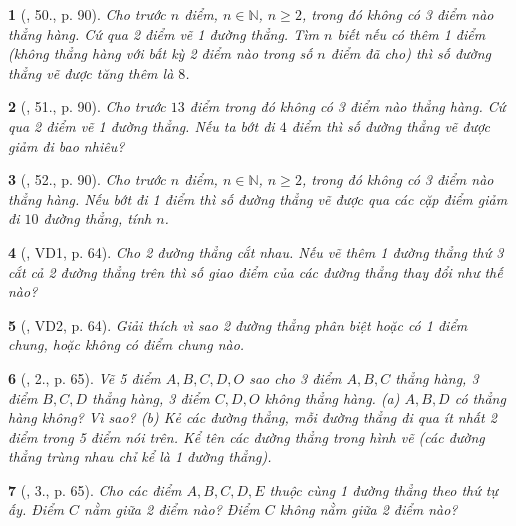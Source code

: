 \documentclass{article}
\newtheorem{baitoan}{}
\begin{document}
\begin{baitoan}[\cite{Tuyen_Toan_6}, 50., p. 90]
	Cho trước $n$ điểm, $n\in\mathbb{N}$, $n\ge2$, trong đó không có 3 điểm nào thẳng hàng. Cứ qua 2 điểm vẽ 1 đường thẳng. Tìm $n$ biết nếu có thêm 1 điểm (không thẳng hàng với bất kỳ 2 điểm nào trong số $n$ điểm đã cho) thì số đường thẳng vẽ được tăng thêm là $8$.
\end{baitoan}

\begin{baitoan}[\cite{Tuyen_Toan_6}, 51., p. 90]
	Cho trước $13$ điểm trong đó không có 3 điểm nào thẳng hàng. Cứ qua 2 điểm vẽ 1 đường thẳng. Nếu ta bớt đi $4$ điểm thì số đường thẳng vẽ được giảm đi bao nhiêu?
\end{baitoan}

\begin{baitoan}[\cite{Tuyen_Toan_6}, 52., p. 90]
	Cho trước $n$ điểm, $n\in\mathbb{N}$, $n\ge2$, trong đó không có 3 điểm nào thẳng hàng. Nếu bớt đi 1 điểm thì số đường thẳng vẽ được qua các cặp điểm giảm đi $10$ đường thẳng, tính $n$.
\end{baitoan}

\begin{baitoan}[\cite{Binh_Toan_6_tap_2}, VD1, p. 64]
	Cho 2 đường thẳng cắt nhau. Nếu vẽ thêm 1 đường thẳng thứ 3 cắt cả 2 đường thẳng trên thì số giao điểm của các đường thẳng thay đổi như thế nào?
\end{baitoan}

\begin{baitoan}[\cite{Binh_Toan_6_tap_2}, VD2, p. 64]
	Giải thích vì sao 2 đường thẳng phân biệt hoặc có 1 điểm chung, hoặc không có điểm chung nào.
\end{baitoan}

\begin{baitoan}[\cite{Binh_Toan_6_tap_2}, 2., p. 65]
	Vẽ 5 điểm $A,B,C,D,O$ sao cho 3 điểm $A,B,C$ thẳng hàng, 3 điểm $B,C,D$ thẳng hàng, 3 điểm $C,D,O$ không thẳng hàng. (a) $A,B,D$ có thẳng hàng không? Vì sao? (b) Kẻ các đường thẳng, mỗi đường thẳng đi qua ít nhất 2 điểm trong 5 điểm nói trên. Kể tên các đường thẳng trong hình vẽ (các đường thẳng trùng nhau chỉ kể là 1 đường thẳng).
\end{baitoan}

\begin{baitoan}[\cite{Binh_Toan_6_tap_2}, 3., p. 65]
	Cho các điểm $A,B,C,D,E$ thuộc cùng 1 đường thẳng theo thứ tự ấy. Điểm $C$ nằm giữa 2 điểm nào? Điểm $C$ không nằm giữa 2 điểm nào?
\end{baitoan}
\end{document}
